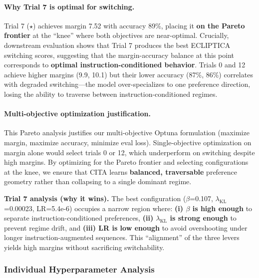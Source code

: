 \paragraph{Why Trial 7 is optimal for switching.}
Trial 7 ($\star$) achieves margin 7.52 with accuracy 89\%, placing it \textbf{on the Pareto frontier} at the ``knee'' where both objectives are near-optimal.
Crucially, downstream evaluation shows that Trial 7 produces the best ECLIPTICA switching scores, suggesting that the margin-accuracy balance at this point corresponds to \textbf{optimal instruction-conditioned behavior}.
Trials 0 and 12 achieve higher margins (9.9, 10.1) but their lower accuracy (87\%, 86\%) correlates with degraded switching---the model over-specializes to one preference direction, losing the ability to traverse between instruction-conditioned regimes.

\paragraph{Multi-objective optimization justification.}
This Pareto analysis justifies our multi-objective Optuna formulation (maximize margin, maximize accuracy, minimize eval loss).
Single-objective optimization on margin alone would select trials 0 or 12, which underperform on switching despite high margins.
By optimizing for the Pareto frontier and selecting configurations at the knee, we ensure that \textsc{CITA} learns \textbf{balanced, traversable} preference geometry rather than collapsing to a single dominant regime.

\vspace{-0.35em}
\noindent\textbf{Trial 7 analysis (why it wins).}
The best configuration ($\beta$=0.107, $\lambda_{\text{KL}}$=0.00023, LR=5.4e-6) occupies a narrow region where:
\textbf{(i) $\beta$ is high enough} to separate instruction-conditioned preferences,
\textbf{(ii) $\lambda_{\text{KL}}$ is strong enough} to prevent regime drift,
and \textbf{(iii) LR is low enough} to avoid overshooting under longer instruction-augmented sequences.
This ``alignment'' of the three levers yields high margins without sacrificing switchability.

\subsubsection{Individual Hyperparameter Analysis}

